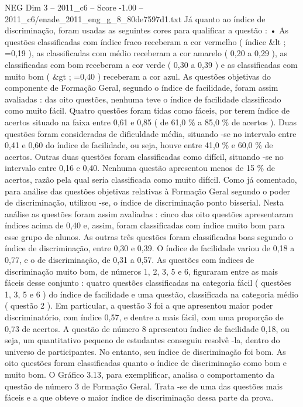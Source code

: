 \begin{textsample}{NEG Dim 3 – 2011\_c6 – Score -1.00 – 2011\_c6/enade\_2011\_eng\_g\_8\_80de7597d1.txt}
Já quanto ao índice de discriminação, foram usadas as seguintes cores para qualificar a questão : • As questões classificadas com índice fraco receberam a cor vermelho ( índice \&lt ; =0,19 ), as classificadas com médio receberam a cor amarelo ( 0,20 a 0,29 ), as classificadas com bom receberam a cor verde ( 0,30 a 0,39 ) e as classificadas com muito bom ( \&gt ; =0,40 ) receberam a cor azul.
As questões objetivas do componente de Formação Geral, segundo o índice de facilidade, foram assim avaliadas : das oito questões, nenhuma teve o índice de facilidade classificado como muito fácil.
Quatro questões foram tidas como fáceis, por terem índice de acertos situado na faixa entre 0,61 e 0,85 ( de 61,0 \% a 85,0 \% de acertos ).
Duas questões foram consideradas de dificuldade média, situando -se no intervalo entre 0,41 e 0,60 do índice de facilidade, ou seja, houve entre 41,0 \% e 60,0 \% de acertos.
Outras duas questões foram classificadas como difícil, situando -se no intervalo entre 0,16 e 0,40.
Nenhuma questão apresentou menos de 15 \% de acertos, razão pela qual seria classificada como muito difícil.
Como já comentado, para análise das questões objetivas relativas à Formação Geral segundo o poder de discriminação, utilizou -se, o índice de discriminação ponto bisserial.
Nesta análise as questões foram assim avaliadas : cinco das oito questões apresentaram índices acima de 0,40 e, assim, foram classificadas com índice muito bom para esse grupo de alunos.
As outras três questões foram classificadas boas segundo o índice de discriminação, entre 0,30 e 0,39.
O índice de facilidade variou de 0,18 a 0,77, e o de discriminação, de 0,31 a 0,57.
As questões com índices de discriminação muito bom, de números 1, 2, 3, 5 e 6, figuraram entre as mais fáceis desse conjunto : quatro questões classificadas na categoria fácil ( questões 1, 3, 5 e 6 ) do índice de facilidade e uma questão, classificada na categoria médio ( questão 2 ).
Em particular, a questão 3 foi a que apresentou maior poder discriminatório, com índice 0,57, e dentre a mais fácil, com uma proporção de 0,73 de acertos.
A questão de número 8 apresentou índice de facilidade 0,18, ou seja, um quantitativo pequeno de estudantes conseguiu resolvê -la, dentro do universo de participantes.
No entanto, seu índice de discriminação foi bom.
As oito questões foram classificadas quanto o índice de discriminação como bom e muito bom.
O Gráfico 3.13, para exemplificar, analisa o comportamento da questão de número 3 de Formação Geral.
Trata -se de uma das questões mais fáceis e a que obteve o maior índice de discriminação dessa parte da prova.

\end{textsample}
